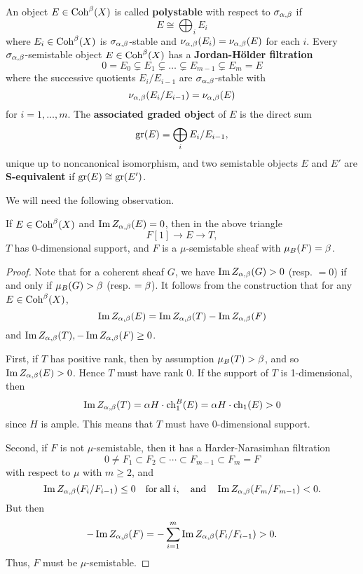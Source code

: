 An object $E \in \operatorname{\mathrm{Coh}}^\beta(X)$ is called \textbf{polystable} with respect to $\sigma_{\alpha,\beta}$ if 
\[ E \cong \bigoplus_i E_i \] 
where $E_i \in \operatorname{\mathrm{Coh}}^\beta(X)$ is $\sigma_{\alpha,\beta}$-stable and $\nu_{\alpha,\beta}(E_i) = \nu_{\alpha,\beta}(E)$ for each $i$. Every $\sigma_{\alpha,\beta}$-semistable object $E \in \operatorname{\mathrm{Coh}}^\beta(X)$ has a \textbf{Jordan-H\"older filtration}
\[ 0 = E_0 \subsetneq E_1 \subsetneq \ldots \subsetneq E_{m-1} \subsetneq E_m = E \]
where the successive quotients $E_i/E_{i-1}$ are $\sigma_{\alpha,\beta}$-stable with 
\[ \nu_{\alpha,\beta}(E_i/E_{i-1}) = \nu_{\alpha,\beta}(E) \] 
for $i = 1,\ldots,m$. The \textbf{associated graded object} of $E$ is the direct sum 
\[ \operatorname{\mathrm{gr}}(E) = \bigoplus_i E_i/E_{i-1}, \] 
unique up to noncanonical isomorphism, and two semistable objects $E$ and $E'$ are \textbf{S-equivalent} if $\operatorname{\mathrm{gr}}(E) \cong \operatorname{\mathrm{gr}}(E')$.

We will need the following observation. 
\begin{lem}\label{ss-ses}
    If $E \in \operatorname{\mathrm{Coh}}^\beta(X)$ and $\operatorname{\mathrm{Im}} Z_{\alpha,\beta}(E) = 0$, then in the above triangle 
    \[ F[1] \to E \to T, \]
    $T$ has 0-dimensional support, and $F$ is a $\mu$-semistable sheaf with $\mu_B(F) \\ = \beta$.
\end{lem}
\begin{proof}
    Note that for a coherent sheaf $G$, we have $\operatorname{\mathrm{Im}} Z_{\alpha,\beta}(G) > 0$ (resp. $= 0$) if and only if $\mu_B(G) > \beta$ (resp. $= \beta$). It follows from the construction that for any $E \in \operatorname{\mathrm{Coh}}^\beta(X)$,
    \[ \operatorname{\mathrm{Im}} Z_{\alpha,\beta}(E) = \operatorname{\mathrm{Im}} Z_{\alpha,\beta}(T) - \operatorname{\mathrm{Im}} Z_{\alpha,\beta}(F) \]
    and $\operatorname{\mathrm{Im}} Z_{\alpha,\beta}(T), -\operatorname{\mathrm{Im}} Z_{\alpha,\beta}(F) \ge 0$. 
    
    First, if $T$ has positive rank, then by assumption $\mu_B(T) > \beta$, and so $\operatorname{\mathrm{Im}} Z_{\alpha,\beta}(E) > 0$. Hence $T$ must have rank 0. If the support of $T$ is 1-dimensional, then \[ \operatorname{\mathrm{Im}} Z_{\alpha,\beta}(T) = \alpha H \cdot \operatorname{\mathrm{ch}}^B_1(E) = \alpha H \cdot \operatorname{\mathrm{ch}}_1(E) > 0 \]
    since $H$ is ample. This means that $T$ must have 0-dimensional support.
    
    Second, if $F$ is not $\mu$-semistable, then it has a Harder-Narasimhan filtration
    \[ 0 \neq F_1 \subset F_2 \subset \cdots \subset F_{m-1} \subset F_m = F \]
    with respect to $\mu$ with $m \ge 2$, and 
    \[ \operatorname{\mathrm{Im}} Z_{\alpha,\beta}(F_i/F_{i-1}) \le 0 \quad \mathrm{for\;all}\; i, \quad \mathrm{and} \quad \operatorname{\mathrm{Im}} Z_{\alpha,\beta}(F_m/F_{m-1}) < 0. \] 
    But then
    \[ - \operatorname{\mathrm{Im}} Z_{\alpha,\beta}(F) = - \sum_{i=1}^m \operatorname{\mathrm{Im}} Z_{\alpha,\beta}(F_i/F_{i-1}) > 0. \]
    Thus, $F$ must be $\mu$-semistable.
\end{proof}

